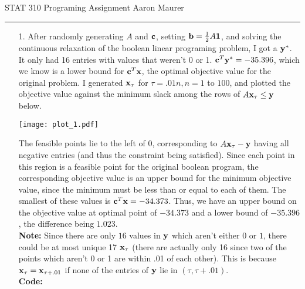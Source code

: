 \documentclass[11pt]{article}
\theoremstyle{definition}
\begin{document}
STAT 310 Programing Assignment \hfill Aaron Maurer
\vspace{2mm}
\hrule
\vspace{2mm}

\begin{itemize}
    \item[1.]
        After randomly generating $A$ and ${\bf c}$, setting \({\bf b}=\frac{1}{2}A{\bf 1}\), and solving the continuous relaxation of the boolean linear programing problem, I got a \({\bf y}^*\). It only had 16 entries with values that weren't 0 or 1. \({\bf c}^T{\bf y}^*=-35.396\), which we know is a lower bound for \({\bf c}^T{\bf x}\), the optimal objective value for the original problem. I generated ${\bf x}_\tau$ for $\tau = .01n, n=1$ to $100$, and plotted the objective value against the minimum slack among the rows of $A{\bf x}_\tau\leq{\bf y}$ below. 
        \begin{center}
            \texttt{[image: plot\_1.pdf]}
        \end{center}
        The feasible points lie to the left of $0$, corresponding to $A{\bf x}_\tau-{\bf y}$ having all negative entries (and thus the constraint being satisfied). Since each point in this region is a feasible point for the original boolean program, the corresponding objective value is an upper bound for the minimum objective value, since the minimum must be less than or equal to each of them. The smallest of these values is ${\bf c}^T{\bf x}=-34.373$. Thus, we have an upper bound on the objective value at optimal point of $-34.373$ and a lower bound of $-35.396$, the difference being $1.023$. \\
 

{\bf Note:} Since there are only $16$ values in ${\bf y}$ which aren't either $0$ or $1$, there could be at most unique 17 ${\bf x}_\tau$ (there are actually only 16 since two of the points which aren't 0 or 1 are within .01 of each other). This is because ${\bf x}_\tau = {\bf x}_{\tau+.01}$ if none of the entries of ${\bf y}$ lie in $(\tau,\tau+.01)$. \\

        {\bf Code:} \\
        


\end{itemize}
\end{document}
